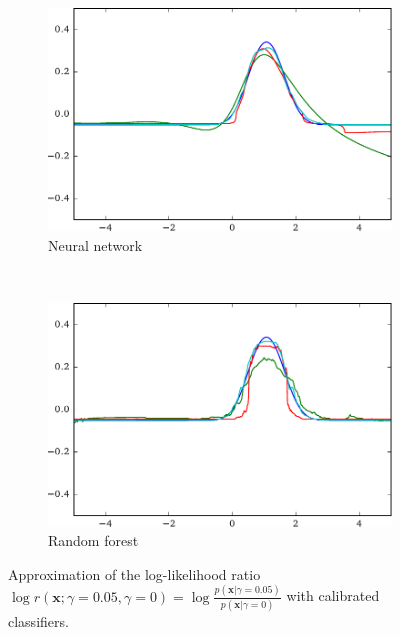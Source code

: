 \documentclass[12pt]{article}
\numberwithin{equation}{section}
\theoremstyle{plain}
\begin{document}
\begin{figure}
    \begin{subfigure}[b]{0.45\textwidth}
        \includegraphics[width=\textwidth]{figures/fig1c.pdf}
        \caption{Neural network}
        \label{fig:1c}
    \end{subfigure}
    ~
    \begin{subfigure}[b]{0.45\textwidth}
        \includegraphics[width=\textwidth]{figures/fig1d.pdf}
        \caption{Random forest}
        \label{fig:1d}
    \end{subfigure}
    \caption{Approximation of the log-likelihood ratio
             $\log r(\mathbf{x};\gamma=0.05,\gamma=0) = \log \frac{p(\mathbf{x}|\gamma=0.05)}{p(\mathbf{x}|\gamma=0)}$
             with calibrated classifiers.}
\end{figure}
\end{document}
